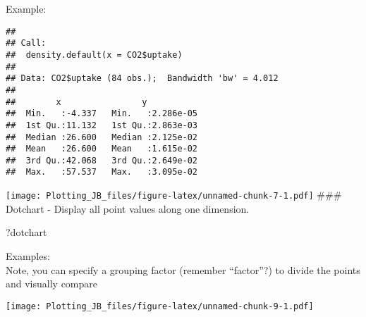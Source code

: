 \documentclass[]{article}
\newenvironment{Shaded}{\begin{snugshade}}{\end{snugshade}}
\newcommand{\DataTypeTok}[1]{\textcolor[rgb]{0.13,0.29,0.53}{#1}}
\newcommand{\KeywordTok}[1]{\textcolor[rgb]{0.13,0.29,0.53}{\textbf{#1}}}
\newcommand{\NormalTok}[1]{#1}
\newcommand{\OperatorTok}[1]{\textcolor[rgb]{0.81,0.36,0.00}{\textbf{#1}}}
\begin{document}
Example:

\begin{Shaded}
\end{Shaded}

\begin{verbatim}
## 
## Call:
##  density.default(x = CO2$uptake)
## 
## Data: CO2$uptake (84 obs.);  Bandwidth 'bw' = 4.012
## 
##        x                y            
##  Min.   :-4.337   Min.   :2.286e-05  
##  1st Qu.:11.132   1st Qu.:2.863e-03  
##  Median :26.600   Median :2.125e-02  
##  Mean   :26.600   Mean   :1.615e-02  
##  3rd Qu.:42.068   3rd Qu.:2.649e-02  
##  Max.   :57.537   Max.   :3.095e-02
\end{verbatim}

\begin{Shaded}
\end{Shaded}

\texttt{[image: Plotting\_JB\_files/figure-latex/unnamed-chunk-7-1.pdf]}
\#\#\# Dotchart - Display all point values along one dimension.

\begin{Shaded}
\begin{Highlighting}[]
\NormalTok{?dotchart}
\end{Highlighting}
\end{Shaded}

Examples:\\
Note, you can specify a grouping factor (remember ``factor''?) to divide
the points and visually compare

\begin{Shaded}
\end{Shaded}

\texttt{[image: Plotting\_JB\_files/figure-latex/unnamed-chunk-9-1.pdf]}

\begin{Shaded}
\end{Shaded}
\end{document}
